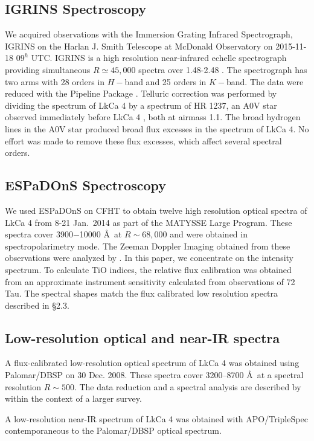 \documentclass[12pt]{report}
\newcommand{\name}{LkCa 4 }
\begin{document}
\subsection{IGRINS Spectroscopy}\label{sec:igrins} 
We acquired observations with the Immersion Grating Infrared Spectrograph, IGRINS \citep{park14} on the Harlan J. Smith Telescope at McDonald Observatory on 2015-11-18 $09^h$ UTC.  IGRINS is a high resolution near-infrared echelle spectrograph providing simultaneous $R\simeq45,000$ spectra over 1.48-2.48 \um.  The spectrograph has two arms with 28 orders in $H-$band and 25 orders in $K-$band.  The data were reduced with the Pipeline Package \citep{jaejoonlee15}.  Telluric correction was performed by dividing the spectrum of \name by a spectrum of HR 1237, an A0V star observed immediately before \name, both at airmass 1.1.  The broad hydrogen lines in the A0V star produced broad flux excesses in the spectrum of LkCa 4.  No effort was made to remove these flux excesses, which affect several spectral orders. 


\subsection{ESPaDOnS Spectroscopy}
We used ESPaDOnS on CFHT to obtain twelve high resolution optical spectra of \name from 8-21 Jan.~2014 as part of the MATYSSE Large Program.  These spectra cover 3900$-$10000 \AA\ at $R\sim68,000$ and were obtained in spectropolarimetry mode.  The Zeeman Doppler Imaging obtained from these observations were analyzed by \citet{donati14}.  In this paper, we concentrate on the intensity spectrum.  To calculate TiO indices, the relative flux calibration was obtained from an approximate instrument sensitivity calculated from observations of 72 Tau.  The spectral shapes match the flux calibrated low resolution spectra described in \S 2.3.


\subsection{Low-resolution optical and near-IR spectra}

A flux-calibrated low-resolution optical spectrum of LkCa 4 was obtained using Palomar/DBSP \citep{Oke1982} on 30 Dec. 2008.  These spectra cover 3200--8700 \AA\ at a spectral resolution $R\sim 500$.  The data reduction and a spectral analysis are described by \citet{herczeg14} within the context of a larger survey.

A low-resolution near-IR spectrum of LkCa 4 was obtained with APO/TripleSpec \citep{Wilson04} contemporaneous to the Palomar/DBSP optical spectrum.
\end{document}
